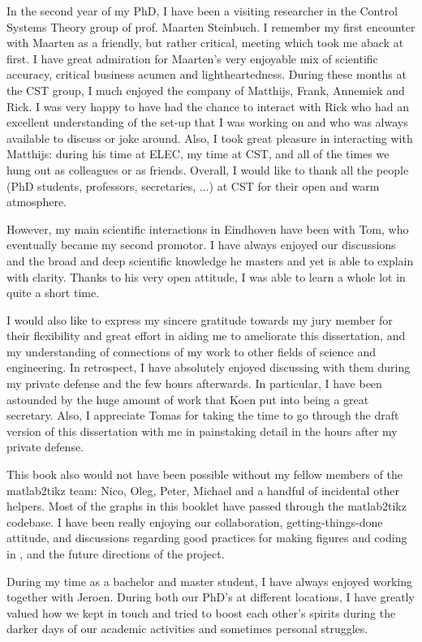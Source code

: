 {In the second year of my PhD, I have been a visiting researcher in the Control Systems Theory group of prof. Maarten Steinbuch.
I remember my first encounter with Maarten as a friendly, but rather critical, meeting which took me aback at first.
I have great admiration for Maarten's very enjoyable mix of scientific accuracy, critical business acumen and lightheartedness.
During these months at the CST group, I much enjoyed the company of Matthijs, Frank, Annemiek and Rick.
I was very happy to have had the chance to interact with Rick who had an excellent understanding of the set-up that I was working on and who was always available to discuss or joke around.
Also, I took great pleasure in interacting with Matthijs: during his time at ELEC, my time at CST, and all of the times we hung out as colleagues or as friends.
Overall, I would like to thank all the people (PhD students, professors, secretaries, ...) at CST for their open and warm atmosphere.

However, my main scientific interactions in Eindhoven have been with Tom, who eventually became my second promotor.
I have always enjoyed our discussions and the broad and deep scientific knowledge he masters and yet is able to explain with clarity.
Thanks to his very open attitude, I was able to learn a whole lot in quite a short time.

I would also like to express my sincere gratitude towards my jury member for their flexibility and great effort in aiding me to ameliorate this dissertation, and my understanding of connections of my work to other fields of science and engineering.
In retrospect, I have absolutely enjoyed discussing with them during my private defense and the few hours afterwards.
In particular, I have been astounded by the huge amount of work that Koen put into being a great secretary.
Also, I appreciate Tomas for taking the time to go through the draft version of this dissertation with me in painstaking detail in the hours after my private defense.

This book also would not have been possible without my fellow members of the matlab2tikz team: Nico, Oleg, Peter, Michael and a handful of incidental other helpers.
Most of the graphs in this booklet have passed through the matlab2tikz codebase.
I have been really enjoying our collaboration, getting-things-done attitude, and discussions regarding good practices for making figures and coding in \MATLAB{}, and the future directions of the project.

During my time as a bachelor and master student, I have always enjoyed working together with Jeroen.
During both our PhD's at different locations, I have greatly valued how we kept in touch and tried to boost each other's spirits during the darker days of our academic activities and sometimes personal struggles.

}
